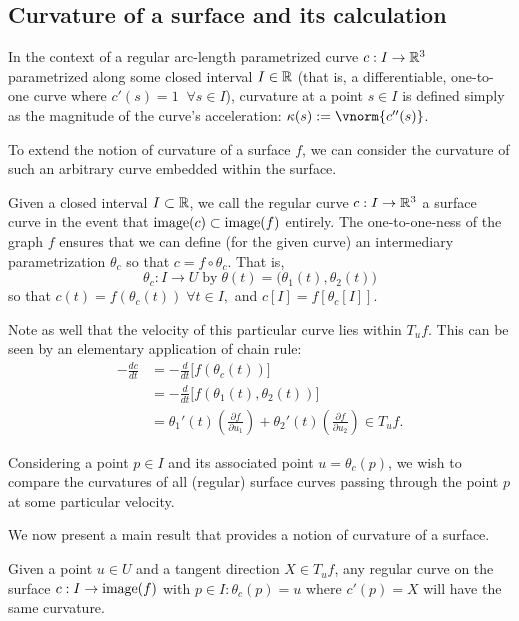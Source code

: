 \subsection{Curvature of a surface and its calculation}
In the context of a regular arc-length parametrized curve $c: I \to \mathbb{R}^3$ parametrized along some closed interval $I\in \mathbb{R}$
 (that is, a differentiable, one-to-one curve where $c'(s) = 1 \;\; \forall s \in I$), curvature at a point $s \in I$ is defined simply as the magnitude of the curve's acceleration: $\kappa(s) := \vnorm{c''(s)}$.
 
 To extend the notion of curvature of a surface $f$, we can consider the curvature of such an arbitrary curve embedded within the surface.
 
 \begin{defn} \label{def:curve-on-a-surface}
 	Given a closed interval $I \subset \mathbb{R}$, we call the regular curve
 	$c: I \to \mathbb{R}^3$ a surface curve in the event that $\mathrm{image}(c) \subset \mathrm{image}(f)$ entirely. The one-to-one-ness of the graph $f$ ensures that we can define (for the given curve) an intermediary parametrization $\theta_c$  so that
 	$ c = f \circ \theta_c $. That is,
 	\[
 	\theta_c : I \to U \; \textrm{by} \; \theta(t) = \big(\theta_1(t), \theta_2(t)\big)
 	\]
 	so that $c(t) = f(\theta_c(t)) \;\forall t\in I,$
 	and $c[I] = f\left[\theta_c[I]\right]$.
 \end{defn}
 Note as well that the velocity of this particular curve lies within $T_u f$. This
 can be seen by an elementary application of chain rule:
 \begin{align}
 -\frac{d c}{dt} &= -\frac{d}{dt}\big[ f(\theta_c(t))\big] \\
 &= -\frac{d}{dt}\big[f(\theta_1(t), \theta_2(t))\big] \\
 &= \theta_1'(t)\left( \frac{\partial f}{\partial u_1} \right) + 
 \theta_2'(t)\left( \frac{\partial f}{\partial u_2} \right) \in T_uf.
 \end{align}
 
 Considering a point $p \in I$ and its associated point $u = \theta_c(p)$, we wish to compare the curvatures of all (regular) surface curves passing through the point $p$ at some particular velocity.
 
 We now present a main result that provides a notion of curvature of a surface.

	\begin{theorem} \label{thm:meusnier}
		Given a point $u \in U $ and a tangent direction $X \in T_u f$,
  any regular curve on the surface $c: I \to \mathrm{image}(f)$ with $p\in I : \theta_c(p) = u$
  where $c'(p) = X$ will have the same curvature.
	\end{theorem}
	
